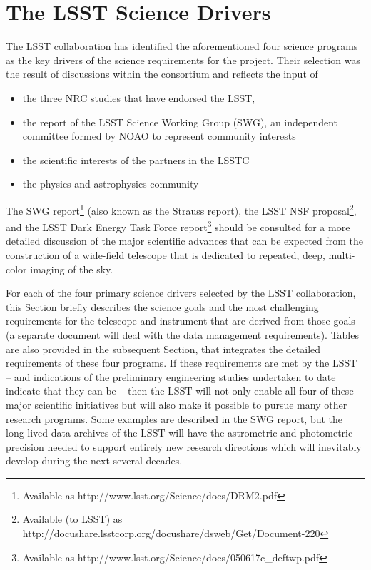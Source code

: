 \section{The LSST Science Drivers }
\label{scidriv}

The LSST collaboration has identified the aforementioned four science
programs as the key drivers of the science requirements for the
project. Their selection was the result of discussions within the
consortium and reflects the input of
\begin{itemize}
\item the three NRC studies that have endorsed the LSST,
\item the report of the LSST Science Working Group (SWG), an independent
      committee formed by NOAO to represent community interests
\item the scientific interests of the partners in the LSSTC
\item the physics and astrophysics community
\end{itemize}

The SWG report\footnote{Available as
http://www.lsst.org/Science/docs/DRM2.pdf} (also known as the Strauss
report), the LSST NSF proposal\footnote{Available (to LSST) as
http://docushare.lsstcorp.org/docushare/dsweb/Get/Document-220}, and the
LSST Dark Energy Task Force report\footnote{Available as
http://www.lsst.org/Science/docs/050617c\_deftwp.pdf} should be
consulted for a more detailed discussion of the major scientific advances
that can be expected from the construction of a wide-field telescope that
is dedicated to repeated, deep, multi-color imaging of the sky.

For each of the four primary science drivers selected by the LSST
collaboration, this
Section briefly describes the science goals and the most challenging
requirements for the telescope and instrument that are derived from those
goals (a separate document will deal with the data management
requirements). Tables are also provided in the subsequent Section, that
integrates the detailed requirements of these four programs. If these
requirements are met by the LSST -- and indications of the preliminary
engineering studies undertaken to date indicate that they can be -- then
the LSST will not only enable all four of these major scientific
initiatives but will also make it possible to pursue many other research
programs. Some examples are described in the SWG report, but the long-lived
data archives of the LSST will have the astrometric and photometric
precision needed to support entirely new research directions which will
inevitably develop during the next several decades.



